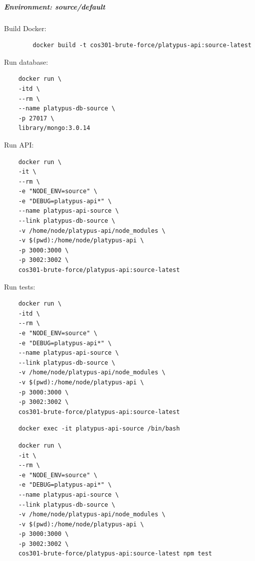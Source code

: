 \documentclass[12pt,a4paper]{article}
\begin{document}
  \subparagraph{Environment:	source/default}  
    \subparagraph{}
	Build Docker:
    \begin{lstlisting}
		docker build -t cos301-brute-force/platypus-api:source-latest
	\end{lstlisting}
    
    \vspace{1cm}
    Run database:
    \begin{lstlisting}
    docker run \
  	-itd \
  	--rm \
  	--name platypus-db-source \
  	-p 27017 \
  	library/mongo:3.0.14
    \end{lstlisting}
    
    \vspace{1cm}
    
    Run API: 
     \begin{lstlisting}
	docker run \
	-it \
	--rm \
  	-e "NODE_ENV=source" \
  	-e "DEBUG=platypus-api*" \
  	--name platypus-api-source \
  	--link platypus-db-source \
  	-v /home/node/platypus-api/node_modules \
  	-v $(pwd):/home/node/platypus-api \
  	-p 3000:3000 \
  	-p 3002:3002 \
  	cos301-brute-force/platypus-api:source-latest
    \end{lstlisting}
    
    \vspace{1cm}
    
    Run tests: 
    \begin{lstlisting}
    docker run \
    -itd \
    --rm \
    -e "NODE_ENV=source" \
    -e "DEBUG=platypus-api*" \
    --name platypus-api-source \
    --link platypus-db-source \
    -v /home/node/platypus-api/node_modules \
    -v $(pwd):/home/node/platypus-api \
    -p 3000:3000 \
    -p 3002:3002 \
    cos301-brute-force/platypus-api:source-latest
    \end{lstlisting}
    
    \vspace{0.5cm}
 	\begin{lstlisting}
	docker exec -it platypus-api-source /bin/bash
	\end{lstlisting}
    
    \vspace{0.5cm}
 	\begin{lstlisting}
	docker run \
    -it \
    --rm \
    -e "NODE_ENV=source" \
    -e "DEBUG=platypus-api*" \
    --name platypus-api-source \
    --link platypus-db-source \
    -v /home/node/platypus-api/node_modules \
    -v $(pwd):/home/node/platypus-api \
    -p 3000:3000 \
    -p 3002:3002 \
    cos301-brute-force/platypus-api:source-latest npm test
    \end{lstlisting}
	
\end{document}
